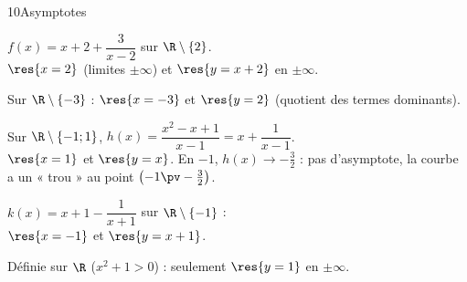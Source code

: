 \begin{deuxcolonnes}
\begin{corrige}{10}{Asymptotes}
\begin{questions}
  \item $f(x)=x+2+\dfrac{3}{x-2}$ sur $\R\setminus\{2\}$.\\
    $\res{x=2}$ (limites $\pm\infty$) et $\res{y=x+2}$ en $\pm\infty$.
  \item Sur $\R\setminus\{-3\}$ : $\res{x=-3}$ et $\res{y=2}$ (quotient des termes dominants).
  \item Sur $\R\setminus\{-1;1\}$, $h(x)=\dfrac{x^{2}-x+1}{x-1}=x+\dfrac{1}{x-1}$.\\
    $\res{x=1}$ et $\res{y=x}$. En $-1$, $h(x)\to-\frac32$ : pas d'asymptote, la courbe a un « trou » au point $\left(-1\pv-\frac32\right)$.
  \item $k(x)=x+1-\dfrac{1}{x+1}$ sur $\R\setminus\{-1\}$ :\\ $\res{x=-1}$ et $\res{y=x+1}$.
  \item Définie sur $\R$ ($x^{2}+1>0$) : seulement $\res{y=1}$ en $\pm\infty$.
\end{questions}
\end{corrige}

\end{deuxcolonnes}

